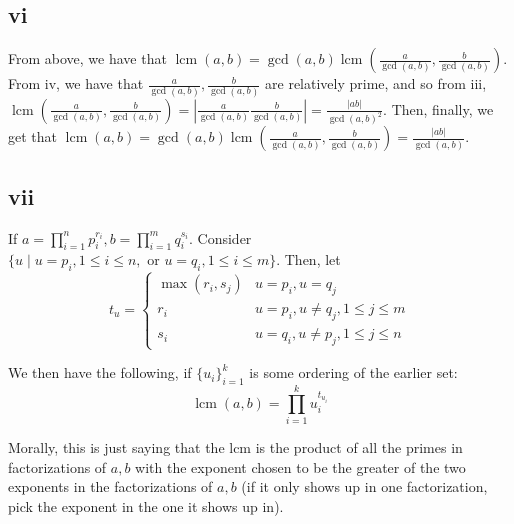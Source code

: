 \documentclass[12pt,letterpaper]{article}
\theoremstyle{definition}
\DeclareMathOperator{\lcm}{lcm}
\begin{document}
\subsection*{vi}

From above, we have that $\lcm(a,b) = \gcd(a,b) \lcm\left(\frac{a}{\gcd(a,b)}, \frac{b}{\gcd(a,b)}\right)$. From iv, we have that $\frac{a}{\gcd(a,b)}, \frac{b}{\gcd(a,b)}$ are relatively prime, and so from iii, $\lcm\left(\frac{a}{\gcd(a,b)}, \frac{b}{\gcd(a,b)}\right) = \left|\frac{a}{\gcd(a,b)}\frac{b}{\gcd(a,b)}\right| = \frac{|ab|}{\gcd(a,b)^{2}}$. Then, finally, we get that $\lcm(a,b) = \gcd(a,b) \lcm\left(\frac{a}{\gcd(a,b)}, \frac{b}{\gcd(a,b)}\right) = \frac{|ab|}{\gcd(a,b)}$.

\subsection*{vii}

If $a = \prod_{i=1}^{n}p_{i}^{r_{i}}, b = \prod_{i=1}^{m}q_{i}^{s_{i}}$. Consider $\{u \mid u = p_{i}, 1 \leq i \leq n, \text{ or } u = q_{i}, 1 \leq i \leq m\}$. Then, let
\[
  t_{u} = \begin{cases}
    \max(r_{i},s_{j}) & u = p_{i}, u = q_{j} \\
    r_{i} & u = p_{i}, u \neq q_{j}, 1 \leq j \leq m \\
    s_{i} & u = q_{i}, u \neq p_{j}, 1 \leq j \leq n
  \end{cases}
\]

We then have the following, if $\{u_{i}\}_{i=1}^{k}$ is some ordering of the earlier set:
\[
  \lcm(a,b) = \prod_{i=1}^{k}u_{i}^{t_{u_{i}}}
\]

Morally, this is just saying that the lcm is the product of all the primes in factorizations of $a,b$ with the exponent chosen to be the greater of the two exponents in the factorizations of $a, b$ (if it only shows up in one factorization, pick the exponent in the one it shows up in).
\end{document}
